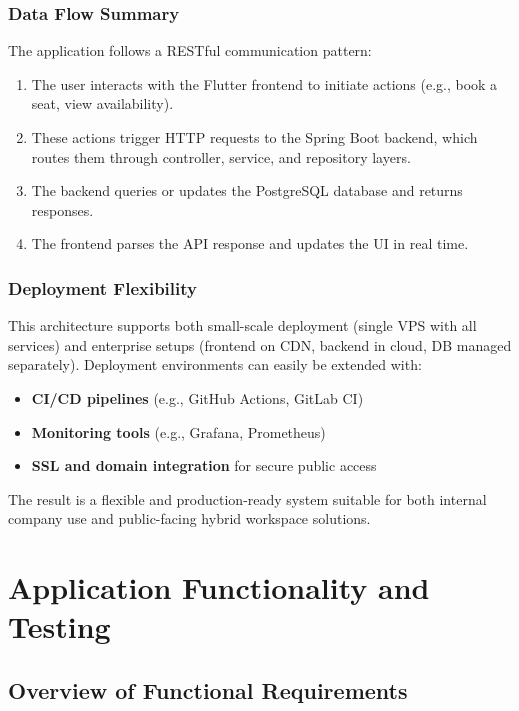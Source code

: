 \documentclass[12pt,a4paper]{report}
\begin{document}
\subsection*{Data Flow Summary}

The application follows a RESTful communication pattern:
\begin{enumerate}
    \item The user interacts with the Flutter frontend to initiate actions (e.g., book a seat, view availability).
    \item These actions trigger HTTP requests to the Spring Boot backend, which routes them through controller, service, and repository layers.
    \item The backend queries or updates the PostgreSQL database and returns responses.
    \item The frontend parses the API response and updates the UI in real time.
\end{enumerate}

\subsection*{Deployment Flexibility}

This architecture supports both small-scale deployment (single VPS with all services) and enterprise setups (frontend on CDN, backend in cloud, DB managed separately). Deployment environments can easily be extended with:
\begin{itemize}
    \item \textbf{CI/CD pipelines} (e.g., GitHub Actions, GitLab CI)
    \item \textbf{Monitoring tools} (e.g., Grafana, Prometheus)
    \item \textbf{SSL and domain integration} for secure public access
\end{itemize}

The result is a flexible and production-ready system suitable for both internal company use and public-facing hybrid workspace solutions.

\newpage

\chapter{Application Functionality and Testing}

\section{Overview of Functional Requirements}
\end{document}
